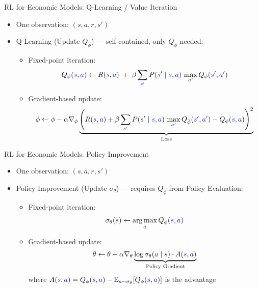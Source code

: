 \documentclass[aspectratio=169]{beamer}
\newcommand{\1}{\mathbf{1}}
\DeclareMathOperator*{\argmax}{arg\,max}
\begin{document}
\begin{frame}{RL for Economic Models: Q-Learning / Value Iteration}
  \begin{itemize}
      \item One observation: $(s, a, r, s')$
      \item Q-Learning (Update $Q_\phi$) --- self-contained, only $Q_\phi$ needed:
        \begin{itemize}
          \item Fixed-point iteration:
          $$Q_\phi(\textcolor{blue}{s}, \textcolor{blue}{a}) \leftarrow R(\textcolor{blue}{s},\textcolor{blue}{a}) \;+\; \beta \sum_{\textcolor{blue}{s'}} P(\textcolor{blue}{s'} \mid \textcolor{blue}{s},\textcolor{blue}{a})\, \max_{\textcolor{blue}{a'}} Q_\phi(\textcolor{blue}{s'}, \textcolor{blue}{a'})$$
          \item Gradient-based update:
          \begin{align*}
            \phi \leftarrow \phi - \alpha \nabla_\phi \underbrace{\left( R(\textcolor{blue}{s},\textcolor{blue}{a}) + \beta \sum_{\textcolor{blue}{s'}} P(\textcolor{blue}{s'} \mid \textcolor{blue}{s},\textcolor{blue}{a})\, \max_{\textcolor{blue}{a'}} Q_{\bar{\phi}}(\textcolor{blue}{s'}, \textcolor{blue}{a'}) - Q_\phi(\textcolor{blue}{s}, \textcolor{blue}{a}) \right)^2}_{\text{Loss}}
          \end{align*}
        \end{itemize}
  \end{itemize}
\end{frame}

\begin{frame}{RL for Economic Models: Policy Improvement}
  \begin{itemize}
      \item One observation: $(s, a, r, s')$
      \item Policy Improvement (Update $\sigma_\theta$) --- requires $Q_\phi$ from Policy Evaluation:
        \begin{itemize}
          \item Fixed-point iteration:
          $$\sigma_\theta(\textcolor{blue}{s}) \leftarrow \argmax_{\textcolor{blue}{a}} Q_\phi(\textcolor{blue}{s}, \textcolor{blue}{a})$$
          \item Gradient-based update:
          \begin{align*}
            \theta \leftarrow \theta + \alpha \nabla_\theta \underbrace{\log \sigma_\theta(\textcolor{blue}{a} \mid \textcolor{blue}{s}) \cdot A(\textcolor{blue}{s}, \textcolor{blue}{a})}_{\text{Policy Gradient}}
          \end{align*}
          where $A(\textcolor{blue}{s},\textcolor{blue}{a}) = Q_\phi(\textcolor{blue}{s},\textcolor{blue}{a}) - \mathbb{E}_{\textcolor{blue}{a} \sim \sigma_\theta}[Q_\phi(\textcolor{blue}{s},\textcolor{blue}{a})]$ is the advantage
        \end{itemize}
  \end{itemize}
\end{frame}
\end{document}
